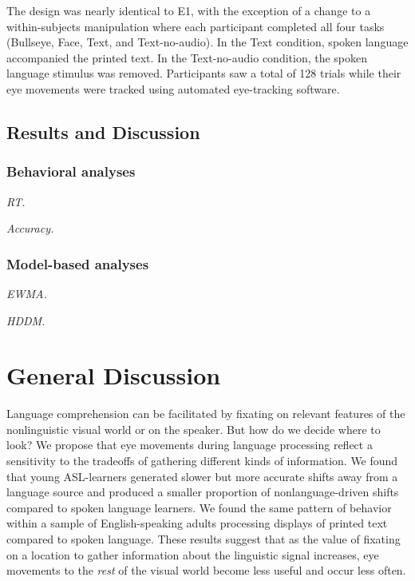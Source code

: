 \documentclass[10pt, letterpaper]{article}
\begin{document}
The design was nearly identical to E1, with the exception of a change to
a within-subjects manipulation where each participant completed all four
tasks (Bullseye, Face, Text, and Text-no-audio). In the Text condition,
spoken language accompanied the printed text. In the Text-no-audio
condition, the spoken language stimulus was removed. Participants saw a
total of 128 trials while their eye movements were tracked using
automated eye-tracking software.

\subsection{Results and Discussion}\label{results-and-discussion-1}

\subsubsection{Behavioral analyses}\label{behavioral-analyses-1}

\emph{RT.}

\emph{Accuracy.}

\subsubsection{Model-based analyses}\label{model-based-analyses-1}

\emph{EWMA.}

\emph{HDDM.}

\section{General Discussion}\label{general-discussion}

Language comprehension can be facilitated by fixating on relevant
features of the nonlinguistic visual world or on the speaker. But how do
we decide where to look? We propose that eye movements during language
processing reflect a sensitivity to the tradeoffs of gathering different
kinds of information. We found that young ASL-learners generated slower
but more accurate shifts away from a language source and produced a
smaller proportion of nonlanguage-driven shifts compared to spoken
language learners. We found the same pattern of behavior within a sample
of English-speaking adults processing displays of printed text compared
to spoken language. These results suggest that as the value of fixating
on a location to gather information about the linguistic signal
increases, eye movements to the \emph{rest} of the visual world become
less useful and occur less often.
\end{document}
